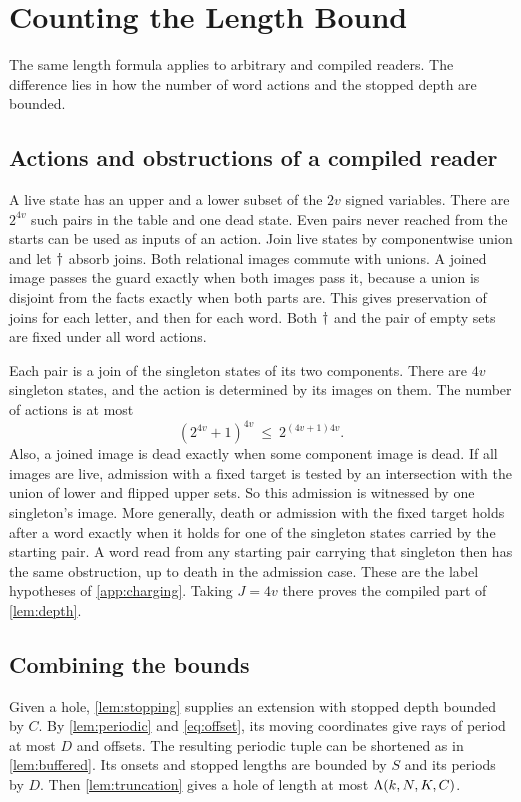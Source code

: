 \section{Counting the Length Bound}
\label{app:counting}

The same length formula applies to arbitrary and compiled readers.
The difference lies in how the number of word actions and the stopped
depth are bounded.

\subsection{Actions and obstructions of a compiled reader}

A live state has an upper and a lower subset of the $2v$ signed
variables. There are $2^{4v}$ such pairs in the table and one dead
state. Even pairs never reached from the starts can be used as inputs
of an action. Join live states by componentwise union and let
$\dagger$ absorb joins. Both relational images commute with unions.
A joined image passes the guard exactly when both images pass it,
because a union is disjoint from the facts exactly when both
parts are. This gives preservation of joins for each letter,
and then for each word. Both $\dagger$ and the pair of empty sets
are fixed under all word actions.

Each pair is a join of the singleton states of its two components.
There are $4v$ singleton states, and the action is determined by
its images on them. The number of actions is at most
\[
  (2^{4v}+1)^{4v}\ \le\ 2^{(4v+1)4v}.
\]
Also, a joined image is dead exactly when some component image is
dead. If all images are live, admission with a fixed target is
tested by an intersection with the union of lower and flipped
upper sets. So this admission is witnessed by one singleton's
image. More generally, death or admission with the fixed target
holds after a word exactly when it holds for one of the singleton
states carried by the starting pair. A word read from any starting
pair carrying that singleton then has the same obstruction, up to
death in the admission case. These are the label hypotheses of
\cref{app:charging}. Taking $J=4v$ there proves the compiled part
of \cref{lem:depth}.

\subsection{Combining the bounds}

Given a hole, \cref{lem:stopping} supplies an extension with stopped
depth bounded by $C$. By \cref{lem:periodic} and \eqref{eq:offset}, its
moving coordinates give rays of period at most $D$ and offsets.
The resulting periodic tuple can be shortened as in
\cref{lem:buffered}. Its onsets and stopped lengths are bounded by
$S$ and its periods by $D$. Then \cref{lem:truncation} gives a hole
of length at most $\Lambda(k,N,K,C)$.

